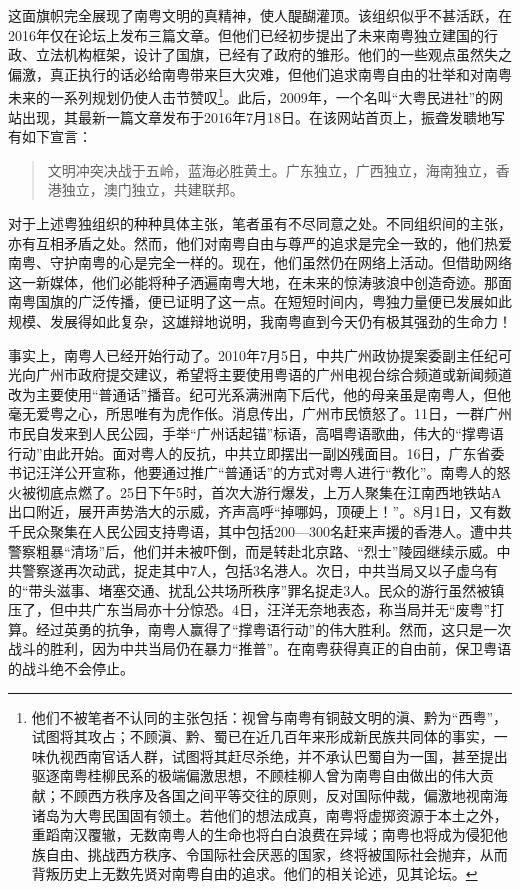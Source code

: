 这面旗帜完全展现了南粤文明的真精神，使人醍醐灌顶。该组织似乎不甚活跃，在2016年仅在论坛上发布三篇文章。但他们已经初步提出了未来南粤独立建国的行政、立法机构框架，设计了国旗，已经有了政府的雏形。他们的一些观点虽然失之偏激，真正执行的话必给南粤带来巨大灾难，但他们追求南粤自由的壮举和对南粤未来的一系列规划仍使人击节赞叹\footnote{他们不被笔者不认同的主张包括：视曾与南粤有铜鼓文明的滇、黔为“西粤”，试图将其攻占；不顾滇、黔、蜀已在近几百年来形成新民族共同体的事实，一味仇视西南官话人群，试图将其赶尽杀绝，并不承认巴蜀自为一国，甚至提出驱逐南粤桂柳民系的极端偏激思想，不顾桂柳人曾为南粤自由做出的伟大贡献；不顾西方秩序及各国之间平等交往的原则，反对国际仲裁，偏激地视南海诸岛为大粤民国固有领土。若他们的想法成真，南粤将虚掷资源于本土之外，重蹈南汉覆辙，无数南粤人的生命也将白白浪费在异域；南粤也将成为侵犯他族自由、挑战西方秩序、令国际社会厌恶的国家，终将被国际社会抛弃，从而背叛历史上无数先贤对南粤自由的追求。他们的相关论述，见其论坛。}。此后，2009年，一个名叫“大粤民进社”的网站出现，其最新一篇文章发布于2016年7月18日。在该网站首页上，振聋发聩地写有如下宣言：

\begin{quote}
文明冲突决战于五岭，蓝海必胜黄土。广东独立，广西独立，海南独立，香港独立，澳门独立，共建联邦。
\end{quote}

对于上述粤独组织的种种具体主张，笔者虽有不尽同意之处。不同组织间的主张，亦有互相矛盾之处。然而，他们对南粤自由与尊严的追求是完全一致的，他们热爱南粤、守护南粤的心是完全一样的。现在，他们虽然仍在网络上活动。但借助网络这一新媒体，他们必能将种子洒遍南粤大地，在未来的惊涛骇浪中创造奇迹。那面南粤国旗的广泛传播，便已证明了这一点。在短短时间内，粤独力量便已发展如此规模、发展得如此复杂，这雄辩地说明，我南粤直到今天仍有极其强劲的生命力！

事实上，南粤人已经开始行动了。2010年7月5日，中共广州政协提案委副主任纪可光向广州市政府提交建议，希望将主要使用粤语的广州电视台综合频道或新闻频道改为主要使用“普通话”播音。纪可光系满洲南下后代，他的母亲虽是南粤人，但他毫无爱粤之心，所思唯有为虎作伥。消息传出，广州市民愤怒了。11日，一群广州市民自发来到人民公园，手举“广州话起锚”标语，高唱粤语歌曲，伟大的“撑粤语行动”由此开始。面对粤人的反抗，中共立即摆出一副凶残面目。16日，广东省委书记汪洋公开宣称，他要通过推广“普通话”的方式对粤人进行“教化”。南粤人的怒火被彻底点燃了。25日下午5时，首次大游行爆发，上万人聚集在江南西地铁站A出口附近，展开声势浩大的示威，齐声高呼“掉哪妈，顶硬上！”。8月1日，又有数千民众聚集在人民公园支持粤语，其中包括200—300名赶来声援的香港人。遭中共警察粗暴“清场”后，他们并未被吓倒，而是转赴北京路、“烈士”陵园继续示威。中共警察遂再次动武，捉走其中7人，包括3名港人。次日，中共当局又以子虚乌有的“带头滋事、堵塞交通、扰乱公共场所秩序”罪名捉走3人。民众的游行虽然被镇压了，但中共广东当局亦十分惊恐。4日，汪洋无奈地表态，称当局并无“废粤”打算。经过英勇的抗争，南粤人赢得了“撑粤语行动”的伟大胜利。然而，这只是一次战斗的胜利，因为中共当局仍在暴力“推普”。在南粤获得真正的自由前，保卫粤语的战斗绝不会停止。

